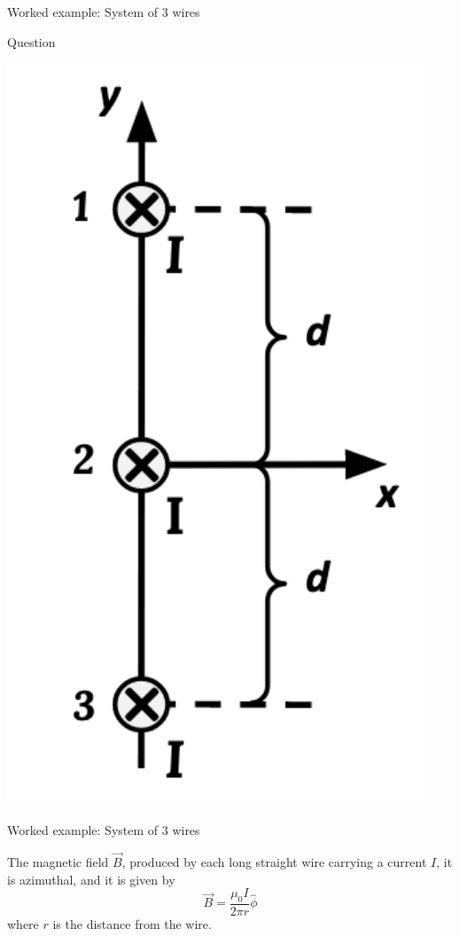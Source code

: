 {\begin{frame}{Worked example: System of 3 wires}
\begin{blockexmplque}{Question}
\begin{minipage}[l]{0.20\textwidth}
\begin{center}
       \includegraphics[width=0.94\textwidth]{./images/problems/lect06_3wires_1}
     \end{center}
    \end{minipage}
  \end{blockexmplque}

\end{frame}

%
%
%

\begin{frame}{Worked example: System of 3 wires}

  The magnetic field $\vec{B}$, produced by each long straight wire
  carrying a current $I$, it is azimuthal, and it is given by
  \begin{equation*}
    \vec{B} = \frac{\mu_0 I}{2 \pi r} \hat{\phi}
  \end{equation*}
  where $r$ is the distance from the wire.\\
  \vspace{0.2cm}


\end{frame}}
